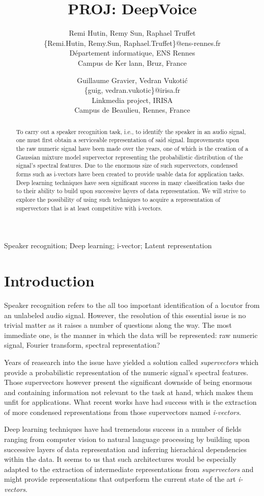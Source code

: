\documentclass[conference]{IEEEtran}
\title{PROJ: DeepVoice}
\author{Remi Hutin, Remy Sun, Raphael Truffet \\
  \{Remi.Hutin, Remy.Sun, Raphael.Truffet\}@ens-rennes.fr \\
  Département informatique, ENS Rennes \\
  Campus de Ker lann, Bruz, France
\and
  Guillaume Gravier, Vedran Vukotić\\
  \{guig, vedran.vukotic\}@irisa.fr\\
  Linkmedia project, IRISA \\
  Campus de Beaulieu, Rennes, France
}
\begin{document}
\maketitle

\begin{abstract}
  To carry out a speaker recognition task, i.e., to identify the speaker in an
audio signal, one must first obtain a serviceable representation
of said signal. Improvements upon the raw numeric signal have been made over the 
years, one of which is the creation of a Gaussian mixture model supervector 
representing the probabilistic distribution of the signal's
spectral features. Due to the enormous size of such supervectors, condensed
forms such as i-vectors have been created to provide usable data for application
tasks. Deep learning techniques have seen significant success in many
classification tasks due to their ability to
build upon successive layers of data representation. We will
strive to explore the possibility of using such techniques to acquire a
representation of supervectors that is at least competitive with i-vectors.

\end{abstract}
\begin{IEEEkeywords}
  Speaker recognition; Deep learning;  i-vector; Latent representation
\end{IEEEkeywords}
\section{Introduction}

Speaker recognition refers to the all too important identification of a locutor
from an unlabeled audio signal. However, the resolution of this essential issue
is no trivial matter as it raises a number of questions along the way. The most
immediate one, is the manner in which the data will be represented: raw numeric
signal, Fourier transform, spectral representation? 

Years of reasearch into the issue have yielded a solution called
\emph{supervectors} which provide a probabilistic representation of the
numeric signal's spectral features. Those supervectors however present the
significant downside of being enormous and containing information not relevant
to the task at hand, which makes them unfit for applications. What recent works
have had success with is the extraction of more condensed representations from
those supervectors named \emph{i-vectors}.

Deep learning techniques have had tremendous success in a number of fields
ranging from computer vision \cite{lecun1998gradient} to natural language
processing \cite{bordes2012joint} by building upon successive layers of data
representation and inferring hierachical dependencies within the data. It seems
to us that such architectures would be especially adapted to the extraction of
intermediate representations from \emph{supervectors} and might provide
representations that outperform the current state of the art \emph{i-vectors}.
\end{document}
